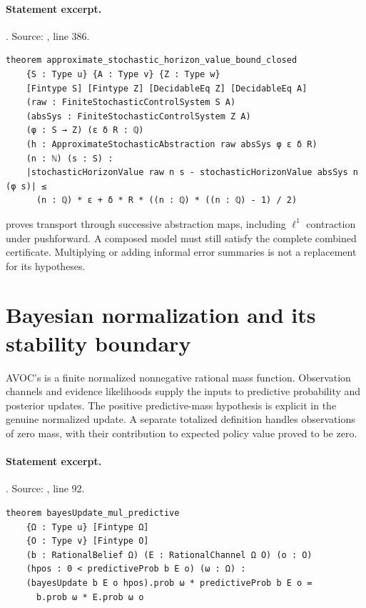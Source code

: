 \documentclass[11pt]{article}
\begin{document}
\paragraph{Statement excerpt.}. Source: , line 386.
\begin{lstlisting}[style=AVOCSource]
theorem approximate_stochastic_horizon_value_bound_closed
    {S : Type u} {A : Type v} {Z : Type w}
    [Fintype S] [Fintype Z] [DecidableEq Z] [DecidableEq A]
    (raw : FiniteStochasticControlSystem S A)
    (absSys : FiniteStochasticControlSystem Z A)
    (φ : S → Z) (ε δ R : ℚ)
    (h : ApproximateStochasticAbstraction raw absSys φ ε δ R)
    (n : ℕ) (s : S) :
    |stochasticHorizonValue raw n s - stochasticHorizonValue absSys n (φ s)| ≤
      (n : ℚ) * ε + δ * R * ((n : ℚ) * ((n : ℚ) - 1) / 2)
\end{lstlisting}


 proves transport through successive abstraction
maps, including $\ell^1$ contraction under pushforward. A composed model must
still satisfy the complete combined certificate. Multiplying or adding
informal error summaries is not a replacement for its hypotheses.

\section{Bayesian normalization and its stability boundary}
AVOC's  is a finite normalized nonnegative rational mass
function. Observation channels and evidence likelihoods supply the inputs to
predictive probability and posterior updates. The positive predictive-mass
hypothesis is explicit in the genuine normalized update. A separate totalized
definition handles observations of zero mass, with their contribution to
expected policy value proved to be zero.

\paragraph{Statement excerpt.}. Source: , line 92.
\begin{lstlisting}[style=AVOCSource]
theorem bayesUpdate_mul_predictive
    {Ω : Type u} [Fintype Ω]
    {O : Type v} [Fintype O]
    (b : RationalBelief Ω) (E : RationalChannel Ω O) (o : O)
    (hpos : 0 < predictiveProb b E o) (ω : Ω) :
    (bayesUpdate b E o hpos).prob ω * predictiveProb b E o =
      b.prob ω * E.prob ω o
\end{lstlisting}
\end{document}
